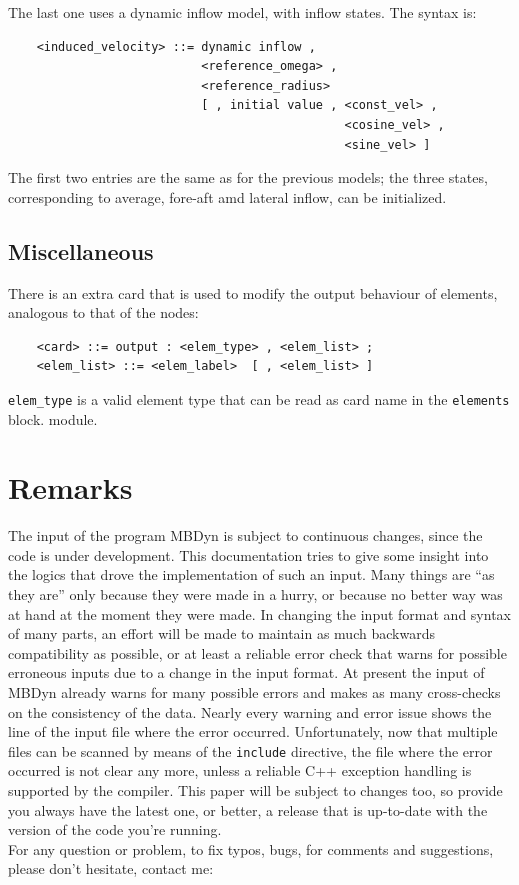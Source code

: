 \noindent
The last one uses a dynamic inflow model, with inflow states.
The syntax is:
\begin{verbatim}
    <induced_velocity> ::= dynamic inflow , 
                           <reference_omega> , 
                           <reference_radius> 
                           [ , initial value , <const_vel> ,
                                               <cosine_vel> ,
                                               <sine_vel> ]
\end{verbatim}
The first two entries are the same as for the previous models;
the three states, corresponding to average, fore-aft amd lateral inflow,
can be initialized.




\section{Miscellaneous}
There is an extra card that is used to modify the output behaviour of 
elements, analogous to that of the nodes:
\begin{verbatim}
    <card> ::= output : <elem_type> , <elem_list> ;
    <elem_list> ::= <elem_label>  [ , <elem_list> ]
\end{verbatim}
\texttt{elem\_type} is a valid element type that can be read 
as card name in the \texttt{elements} block.
module.





\chapter{Remarks}
The input of the program MBDyn is subject to continuous changes, since the
code is under development.
This documentation tries to give some insight into the logics that drove
the implementation of such an input.
Many things are ``as they are'' only because they were made in a hurry, 
or because no better way was at hand at the moment they were made.
In changing the input format and syntax of many parts, an effort 
will be made to maintain as much backwards compatibility as possible,
or at least a reliable error check that warns for possible erroneous 
inputs due to a change in the input format. 
At present the input of MBDyn already warns for many possible errors 
and makes as many cross-checks on the consistency of the data. 
Nearly every warning and error issue shows the line of the input file 
where the error occurred. 
Unfortunately, now that multiple files can be scanned by means of the 
\texttt{include} directive, the file where the error occurred is not clear 
any more, unless a reliable C++ exception handling is supported by the
compiler.
This paper will be subject to changes too, so provide you always have the
latest one, or better, a release that is up-to-date with the version of the
code you're running. \\
For any question or problem, to fix typos, bugs, for comments and
suggestions, please don't hesitate, contact me:\vspace{10mm}\\

